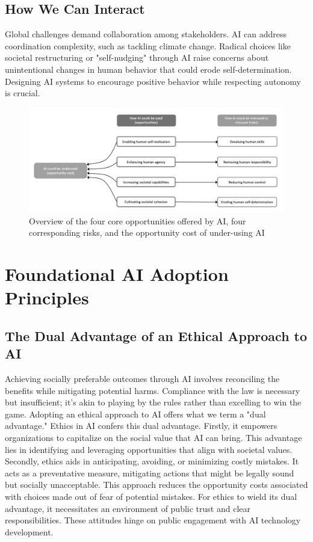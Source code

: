 \subsection{How We Can Interact}
Global challenges demand collaboration among stakeholders. AI can address coordination complexity, such as tackling climate change. Radical choices like societal restructuring or "self-nudging" through AI raise concerns about unintentional changes in human behavior that could erode self-determination. Designing AI systems to encourage positive behavior while respecting autonomy is crucial.

\begin{figure}[h]
    \centering
    \includegraphics[width=0.75\linewidth]{Assets/AI Overview.png}
    \caption{Overview of the four core opportunities offered by AI, four corresponding risks, and the opportunity cost of under-using AI}
    \label{fig:Ai-overview}
\end{figure}

\section{Foundational AI Adoption Principles}

\subsection{The Dual Advantage of an Ethical Approach to AI}
Achieving socially preferable outcomes through AI involves reconciling the benefits while mitigating potential harms. Compliance with the law is necessary but insufficient; it's akin to playing by the rules rather than excelling to win the game. Adopting an ethical approach to AI offers what we term a "dual advantage."
Ethics in AI confers this dual advantage. Firstly, it empowers organizations to capitalize on the social value that AI can bring. This advantage lies in identifying and leveraging opportunities that align with societal values. Secondly, ethics aids in anticipating, avoiding, or minimizing costly mistakes. It acts as a preventative measure, mitigating actions that might be legally sound but socially unacceptable. This approach reduces the opportunity costs associated with choices made out of fear of potential mistakes.
For ethics to wield its dual advantage, it necessitates an environment of public trust and clear responsibilities. These attitudes hinge on public engagement with AI technology development. 

